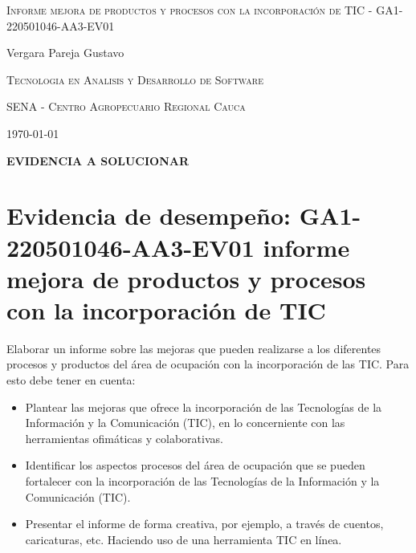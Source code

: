 \documentclass{article}
\author{Gustavo Vergara}
\theoremstyle{mytheoremstyle}
\theoremstyle{mytheoremstyle}
\theoremstyle{myproblemstyle}
\begin{document}
\begin{titlepage}
    \centering
    
    
    \vspace{3cm}
    {\scshape \Large Informe mejora de productos y procesos con la incorporación de TIC - GA1-220501046-AA3-EV01 \par}
    \vspace{7cm}
    \textbf\large\scshape{\par}
         \vspace{0.5cm}
         
    {\Large Vergara Pareja Gustavo\par}
    \vspace{7cm}
    {\scshape\Large Tecnologia en Analisis y Desarrollo de Software \par}
    \vspace{1cm}
    {\scshape\Large SENA - Centro Agropecuario Regional Cauca\par}
    \vspace{1cm}
    {\Large \today \par}
    \end{titlepage}

 

\newpage

\begin{flushleft}
    \large \textbf{EVIDENCIA A SOLUCIONAR}\\
    \vspace{1cm}
    
    \section*{Evidencia de desempeño: GA1-220501046-AA3-EV01 informe mejora de productos y procesos con la incorporación de TIC}
    Elaborar un informe sobre las mejoras que pueden realizarse a los diferentes procesos y productos del área de ocupación con la incorporación de las TIC. Para esto debe tener en cuenta:
    \begin{itemize}
    \item Plantear las mejoras que ofrece la incorporación de las Tecnologías de la Información y la Comunicación (TIC), en lo concerniente con las herramientas ofimáticas y colaborativas.
    \item Identificar los aspectos procesos del área de ocupación que se pueden fortalecer con la incorporación de las Tecnologías de la Información y la Comunicación (TIC).
    \item Presentar el informe de forma creativa, por ejemplo, a través de cuentos, caricaturas, etc. Haciendo uso de una herramienta TIC en línea.
    \end{itemize}
    \end{flushleft}
    \newpage
    \tableofcontents
    
\end{document}
